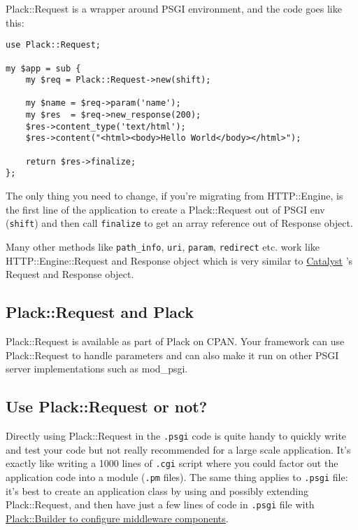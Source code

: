 Plack::Request is a wrapper around PSGI environment, and the code goes
like this:

\begin{lstlisting}
use Plack::Request;

my $app = sub {
    my $req = Plack::Request->new(shift);
    
    my $name = $req->param('name');
    my $res  = $req->new_response(200);
    $res->content_type('text/html');
    $res->content("<html><body>Hello World</body></html>");
    
    return $res->finalize;
};
\end{lstlisting}

The only thing you need to change, if you're migrating from
HTTP::Engine, is the first line of the application to create a
Plack::Request out of PSGI env (\lstinline!shift!) and then call
\lstinline!finalize! to get an array reference out of Response object.

Many other methods like \lstinline!path_info!, \lstinline!uri!,
\lstinline!param!, \lstinline!redirect! etc. work like
HTTP::Engine::Request and Response object which is very similar to
\href{http://search.cpan.org/dist/Catalyst-Runtime}{Catalyst} 's Request
and Response object.

\subsection{Plack::Request and Plack}\label{plackrequest-and-plack}

Plack::Request is available as part of Plack on CPAN. Your framework can
use Plack::Request to handle parameters and can also make it run on
other PSGI server implementations such as mod\_psgi.

\subsection{Use Plack::Request or not?}\label{use-plackrequest-or-not}

Directly using Plack::Request in the \lstinline!.psgi! code is quite
handy to quickly write and test your code but not really recommended for
a large scale application. It's exactly like writing a 1000 lines of
\lstinline!.cgi! script where you could factor out the application code
into a module (\lstinline!.pm! files). The same thing applies to
\lstinline!.psgi! file: it's best to create an application class by
using and possibly extending Plack::Request, and then have just a few
lines of code in \lstinline!.psgi! file with
\href{http://advent.plackperl.org/2009/12/day-11-using-plackbuilder.html}{Plack::Builder
to configure middleware components}.

